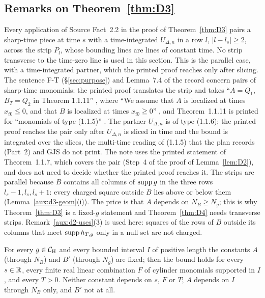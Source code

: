 \subsection{Remarks on Theorem~\ref{thm:D3}}\label{sub:d3-rem}

\begin{auxrem}\label{aux:d3-orient}
Every application of Source Fact~2.2 in the proof of Theorem~\ref{thm:D3} pairs a sharp-time
piece at time $s$ with a time-integrated $U_{\Delta,n}$ in a row $l$, $|l-l_s|\ge2$, across the
strip $P_l$, whose bounding lines are lines of constant time.  No strip transverse to the
time-zero line is used in this section.  This is the parallel case, with a time-integrated
partner, which the printed proof reaches only after slicing.  The sentence F-T
(\S\ref{sec:purpose}) and Lemma~7.4 of the record \cite[p.~21]{R} concern pairs of sharp-time
monomials: the printed proof translates the strip and takes ``$A=Q_1$, $B_T=Q_2$ in Theorem
1.1.11'' \cite[p.~597]{GJS}, where ``We assume that $A$ is localized at times $x_{i0}\leqq0$, and
that $B$ is localized at times $x_{i0}\geqq0$'' \cite[p.~596]{GJS}, and Theorem~1.1.11 is printed
for ``monomials of type (1.1.5)'' \cite[p.~596]{GJS}.  The partner $U_{\Delta,n}$ is of type
(1.1.6); the printed proof reaches the pair only after $U_{\Delta,n}$ is sliced in time and the
bound is integrated over the slices, the multi-time reading of (1.1.5) that the plan records
(Part~2) and GJS do not print.  The note uses the printed statement of Theorem~1.1.7, which covers
the pair (Step~4 of the proof of Lemma~\ref{lem:D2}), and does not need to decide whether the
printed proof reaches it.  The strips are parallel because $B$ contains all columns of $\operatorname{supp} g$
in the three rows $l_s-1,l_s,l_s+1$: every charged square outside $B$ lies above or below them
(Lemma~\ref{aux:d3-geom}(i)).  The price is that $A$ depends on $N_B\ge N_g$; this is why
Theorem~\ref{thm:D3} is a fixed-$g$ statement and Theorem~\ref{thm:D4} needs transverse strips.
Remark~\ref{aux:d2-uses}(3) is used here: squares of the rows of $B$ outside its columns that meet
$\operatorname{supp} h_{T,g}$ only in a null set are not charged.
\end{auxrem}

\begin{auxrem}\label{aux:d3-quant}
For every $g\in\mathcal{C}_{\mathrm H}$ and every bounded interval $I$ of positive length the constants $A$ (through
$N_B$) and $B'$ (through $N_g$) are fixed; then the bound holds for every $s\in\mathbb{R}$, every finite
real linear combination $F$ of cylinder monomials supported in $I$, and every $T>0$.  Neither
constant depends on $s$, $F$ or $T$; $A$ depends on $I$ through $N_B$ only, and $B'$ not at all.
\end{auxrem}

